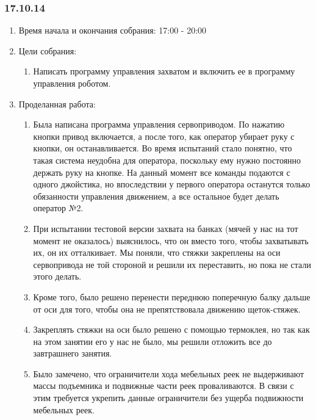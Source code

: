
\subsubsection{17.10.14}

\begin{enumerate}
	\item Время начала и окончания собрания:
	17:00 - 20:00
	\item Цели собрания:
	\begin{enumerate}
	  \item Написать программу управления захватом и включить ее в программу управления роботом.
	  
    \end{enumerate}
    
	\item Проделанная работа:
	\begin{enumerate}
	  \item Была написана программа управления сервоприводом. По нажатию кнопки привод включается, а после того, как оператор убирает руку с кнопки, он останавливается. Во время испытаний стало понятно, что такая система неудобна для оператора, поскольку ему нужно постоянно держать руку на кнопке. На данный момент все команды подаются с одного джойстика, но впоследствии у первого оператора останутся только обязанности управления движением, а все остальное будет делать оператор №2.
      
      \item При испытании тестовой версии захвата на банках (мячей у нас на тот момент не оказалось) выяснилось, что он вместо того, чтобы захватывать их, он их отталкивает. Мы поняли, что стяжки закреплены на оси сервопривода не той стороной и решили их переставить, но пока не стали этого делать.
      
      \item Кроме того, было решено перенести переднюю поперечную балку дальше от оси для того, чтобы она не препятствовала движению щеток-стяжек.
      
      \item Закреплять стяжки на оси было решено с помощью термоклея, но так как на этом занятии его у нас не было, мы решили отложить все до завтрашнего занятия.
      
      \item Было замечено, что ограничители хода мебельных реек не выдерживают массы подъемника и подвижные части реек проваливаются. В связи с этим требуется укрепить данные ограничители без ущерба подвижности мебельных реек.
      

\end{enumerate}
\end{enumerate}
